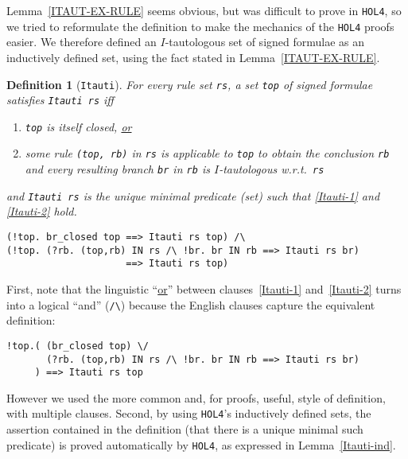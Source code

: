 \documentclass[a4paper]{article}
\newtheorem{definition}{Definition}
\newcommand{\hol}{\texttt{HOL4}}
\begin{document}
Lemma~\ref{ITAUT-EX-RULE} seems obvious, but was difficult to prove in
\hol, so we tried to reformulate the definition to make the
mechanics of the \hol{} proofs easier. We therefore defined an $I$-tautologous
set of signed formulae as an inductively defined set, using the fact
stated in Lemma~\ref{ITAUT-EX-RULE}.
\begin{definition}[\texttt{Itauti}]\label{Itauti} 
  For every rule set \texttt{rs}, a set \texttt{top} of signed
  formulae satisfies \texttt{Itauti rs} iff
  \begin{enumerate} 
  \item \label{Itauti-1}
    \texttt{top} is itself closed, \underline{or}
  \item \label{Itauti-2}
   some rule \texttt{(top, rb)} in \texttt{rs} 
   is applicable to \texttt{top} to obtain the conclusion \texttt{rb} 
   and every resulting branch \texttt{br} in \texttt{rb} is
  $I$-tautologous w.r.t.\ \texttt{rs}
  \end{enumerate} 
  and \texttt{Itauti rs} is the unique minimal predicate (set) such that
  \ref{Itauti-1} and \ref{Itauti-2} hold.
\begin{verbatim} 
(!top. br_closed top ==> Itauti rs top) /\ 
(!top. (?rb. (top,rb) IN rs /\ !br. br IN rb ==> Itauti rs br)  
                     ==> Itauti rs top)
\end{verbatim}
\end{definition}

First, note that the linguistic ``\underline{or}'' between clauses~\ref{Itauti-1}
and~\ref{Itauti-2} turns into a logical
``and'' (\verb!/\!) because the English clauses capture the
equivalent definition:
\begin{verbatim} 
!top.( (br_closed top) \/ 
       (?rb. (top,rb) IN rs /\ !br. br IN rb ==> Itauti rs br)
     ) ==> Itauti rs top
\end{verbatim}

However we used the more common and, for proofs, useful,
style of definition, with multiple clauses.
Second, by using  \hol's inductively defined sets, the assertion
contained in the definition (that there is a unique minimal such
predicate) is proved automatically by \hol, as expressed in
Lemma~\ref{Itauti-ind}.
\end{document}
